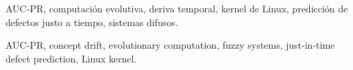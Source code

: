 \documentclass[conference,letterpaper]{IEEEtran}
\renewcommand{\IEEEkeywordsname}{Palabras clave}
\begin{document}
\begin{IEEEkeywords}
AUC-PR, computación evolutiva, deriva temporal, kernel de Linux, predicción de defectos justo a tiempo, sistemas difusos.
\end{IEEEkeywords}

\begingroup\renewcommand{\IEEEkeywordsname}{Index Terms}
\begin{IEEEkeywords}
AUC-PR, concept drift, evolutionary computation, fuzzy systems, just-in-time defect prediction, Linux kernel.
\end{IEEEkeywords}\endgroup















\appendices

\end{document}
